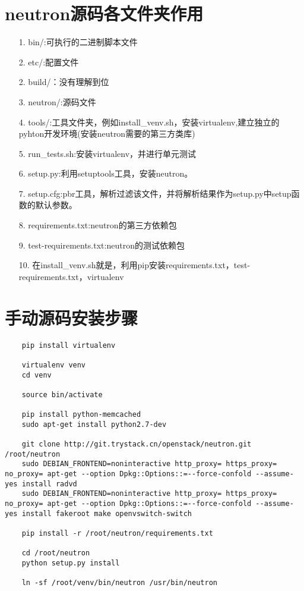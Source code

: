\documentclass[a4paper,left=1.5cm,right=1.5cm,11pt]{article}
\begin{document}
\tableofcontents

\clearpage

\section{neutron源码各文件夹作用}
    \begin{itemize}
        \item[1.]bin/:可执行的二进制脚本文件
		\item[2.]etc/:配置文件
		\item[2.]build/：没有理解到位
		\item[3.]neutron/:源码文件
		\item[4.]tools/:工具文件夹，例如install_venv.sh，安装virtualenv,建立独立的pyhton开发环境(安装neutron需要的第三方类库)
		\item[5.]run\_tests.sh:安装virtualenv，并进行单元测试
		\item[6.]setup.py:利用setuptools工具，安装neutron。
		\item[7.]setup.cfg:pbr工具，解析过滤该文件，并将解析结果作为setup.py中setup函数的默认参数。
		\item[8.]requirements.txt:neutron的第三方依赖包
		\item[9.]test-requirements.txt:neutron的测试依赖包
		\item[10.]在install_venv.sh就是，利用pip安装requirements.txt，test-requirements.txt，virtualenv
    \end{itemize}

\section{手动源码安装步骤}
	\begin{lstlisting}
	pip install virtualenv
	
	virtualenv venv
	cd venv

	source bin/activate

	pip install python-memcached
	sudo apt-get install python2.7-dev

	git clone http://git.trystack.cn/openstack/neutron.git /root/neutron
	sudo DEBIAN_FRONTEND=noninteractive http_proxy= https_proxy= no_proxy= apt-get --option Dpkg::Options::=--force-confold --assume-yes install radvd
	sudo DEBIAN_FRONTEND=noninteractive http_proxy= https_proxy= no_proxy= apt-get --option Dpkg::Options::=--force-confold --assume-yes install fakeroot make openvswitch-switch

	pip install -r /root/neutron/requirements.txt

	cd /root/neutron
	python setup.py install

	ln -sf /root/venv/bin/neutron /usr/bin/neutron
	\end{lstlisting}
\end{document}
